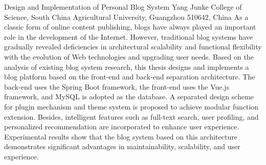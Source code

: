 \documentclass[UTF8,AutoFakeBold=1,AutoFakeSlant,zihao=-4]{SCAU}
\begin{document}
\coverpage      %



\begin{authorization}
\end{authorization}

\begin{abstract}
博客作为一种经典的网络内容发布形式，在互联网发展历程中始终扮演着重要角色。然而，随着用户需求的不断升级和Web技术的持续演进，传统博客系统在架构扩展性和功能灵活性方面逐渐暴露出诸多不足。

本文在分析现有博客系统研究现状的基础上，采用前后端分离架构设计并实现了一个功能完善、可扩展性强的博客平台。系统后端基于Spring Boot框架构建，前端采用Vue.js框架，数据库选用MySQL。在系统架构设计上，本文采用插件机制与主题系统分离的设计方案，实现了功能的模块化扩展。同时，系统融入了全文搜索、用户画像分析、个性化推荐等智能化功能，以提升用户体验。

从实际测试结果来看，采用前后端分离架构的博客系统在可维护性、可扩展性和用户体验方面均表现出一定优势。
\end{abstract}

\begin{abstractEN}
{Design and Implementation of Personal Blog System}  %
{Yang Junke}  %
{College of Science, South China Agricultural University, Guangzhou 510642, China}  %
{As a classic form of online content publishing, blogs have always played an important role in the development of the Internet. However, traditional blog systems have gradually revealed deficiencies in architectural scalability and functional flexibility with the evolution of Web technologies and upgrading user needs.\abspar
Based on the analysis of existing blog system research, this thesis designs and implements a blog platform based on the front-end and back-end separation architecture. The back-end uses the Spring Boot framework, the front-end uses the Vue.js framework, and MySQL is adopted as the database. A separated design scheme for plugin mechanism and theme system is proposed to achieve modular function extension. Besides, intelligent features such as full-text search, user profiling, and personalized recommendation are incorporated to enhance user experience.\abspar
Experimental results show that the blog system based on this architecture demonstrates significant advantages in maintainability, scalability, and user experience.}
\end{abstractEN}
\end{document}
